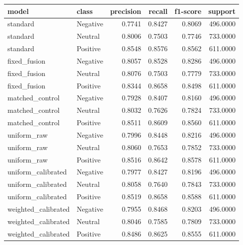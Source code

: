 \begin{tabular}{llrrrr}
\toprule
model & class & precision & recall & f1-score & support \\
\midrule
standard & Negative & 0.7741 & 0.8427 & 0.8069 & 496.0000 \\
standard & Neutral & 0.8006 & 0.7503 & 0.7746 & 733.0000 \\
standard & Positive & 0.8548 & 0.8576 & 0.8562 & 611.0000 \\
fixed\_fusion & Negative & 0.8057 & 0.8528 & 0.8286 & 496.0000 \\
fixed\_fusion & Neutral & 0.8076 & 0.7503 & 0.7779 & 733.0000 \\
fixed\_fusion & Positive & 0.8344 & 0.8658 & 0.8498 & 611.0000 \\
matched\_control & Negative & 0.7928 & 0.8407 & 0.8160 & 496.0000 \\
matched\_control & Neutral & 0.8032 & 0.7626 & 0.7824 & 733.0000 \\
matched\_control & Positive & 0.8511 & 0.8609 & 0.8560 & 611.0000 \\
uniform\_raw & Negative & 0.7996 & 0.8448 & 0.8216 & 496.0000 \\
uniform\_raw & Neutral & 0.8060 & 0.7653 & 0.7852 & 733.0000 \\
uniform\_raw & Positive & 0.8516 & 0.8642 & 0.8578 & 611.0000 \\
uniform\_calibrated & Negative & 0.7977 & 0.8427 & 0.8196 & 496.0000 \\
uniform\_calibrated & Neutral & 0.8058 & 0.7640 & 0.7843 & 733.0000 \\
uniform\_calibrated & Positive & 0.8519 & 0.8658 & 0.8588 & 611.0000 \\
weighted\_calibrated & Negative & 0.7955 & 0.8468 & 0.8203 & 496.0000 \\
weighted\_calibrated & Neutral & 0.8046 & 0.7585 & 0.7809 & 733.0000 \\
weighted\_calibrated & Positive & 0.8486 & 0.8625 & 0.8555 & 611.0000 \\
\bottomrule
\end{tabular}
